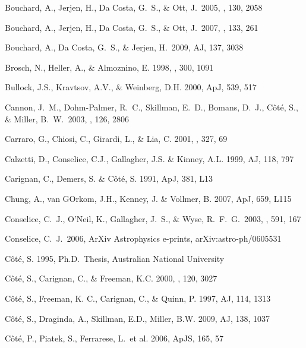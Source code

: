\documentclass[12pt,preprint]{emulateapj}
\begin{document}
\begin{thebibliography}{}
Bouchard, A., Jerjen, H., Da Costa, G.~S., \& Ott, J.\ 2005, \aj, 130, 2058 

Bouchard, A., Jerjen, H., Da Costa, G.~S., \& Ott, J.\ 2007, \aj, 133, 261 

Bouchard, A., Da Costa, G.~S., \& Jerjen, H.\ 2009, AJ, 137, 3038

Brosch, N., Heller, A., \& Almoznino, E. 1998, \mnras , 300, 1091

Bullock, J.S., Kravtsov, A.V., \& Weinberg, D.H. 2000, ApJ, 539, 517

Cannon, J.~M., Dohm-Palmer, R.~C., Skillman, E.~D., Bomans, D.~J., 
C{\^o}t{\'e}, S., \& Miller, B.~W.\ 2003, \aj, 126, 2806 

Carraro, G., Chiosi, C., Girardi, L., \& Lia, C. 2001, \mnras, 327, 69 

Calzetti, D., Conselice, C.J., Gallagher, J.S. \& Kinney, A.L. 1999, AJ, 118, 797

Carignan, C., Demers, S. \& C\^ot\'e, S. 1991, ApJ, 381, L13

Chung, A., van GOrkom, J.H., Kenney, J. \& Vollmer, B. 2007, ApJ, 659, L115 

Conselice, C.~J., O'Neil, K., Gallagher, J.~S., \& Wyse, R.~F.~G.\ 2003, \apj, 591, 167 

Conselice, C.~J.\ 2006, ArXiv Astrophysics e-prints, arXiv:astro-ph/0605531 

C\^ot\'e, S. 1995, Ph.D.\ Thesis, Australian National University

C\^ot\'e, S., Carignan, C., \& Freeman, K.C. 2000, \aj , 120, 3027

C\^ot\'e, S., Freeman, K. C., Carignan, C., \& Quinn, P. 1997, AJ, 114, 1313

C\^ot\'e, S., Draginda, A., Skillman, E.D., Miller, B.W. 2009, AJ, 138, 1037

C\^ot\'e, P., Piatek, S., Ferrarese, L.~et al. 2006, ApJS, 165, 57


\end{thebibliography}
\end{document}
